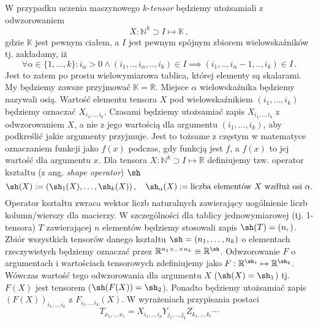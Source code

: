 \documentclass{myclass}
\begin{document}
W przypadku uczenia maszynowego \(k\)-\textit{tensor} będziemy utożsamiali z odwzorowaniem
\begin{equation*}
    X:\mathbb{N}^k\supset I \mapsto \mathbb{K}\,,
\end{equation*}
gdzie \(\mathbb{K}\) jest pewnym ciałem, a \(I\) jest pewnym spójnym zbiorem wielowskaźników tj.
zakładamy, iż 
\begin{equation*}
    \forall \alpha \in
    \{1,\ldots, k\} : i_\alpha > 0 \land (i_1,..,i_\alpha,..,i_k) \in I \implies (i_1,..,i_\alpha -
    1,..,i_k) \in I\,.
\end{equation*}
Jest to zatem po prostu wielowymiarowa tablica, której elementy są skalarami. My będziemy zawsze
przyjmować \(\mathbb{K} = \mathbb{R}\). Miejsce \(\alpha\) wielowskaźnika będziemy nazywali osią.
Wartość elementu tensora \(X\) pod wielowskaźnikiem \((i_1, \ldots, i_k)\) będziemy oznaczać
\(X_{i_1,..,i_k}\). Czasami będziemy utożsamiać zapis \(X_{i_1,..,i_k}\) z odwzorowaniem \(X\), a
nie z jego wartością dla argumentu \((i_1, \ldots, i_k)\), aby podkreślić jakie argumenty przyjmuje.
Jest to tożsame z częstym w matematyce oznaczaniem funkcji jako \(f(x)\) podczas, gdy funkcją jest
\(f\), a \(f(x)\) to jej wartość dla argumentu \(x\).\hfill \break
Dla tensora \(X:\mathbb{N}^k\supset I \mapsto \mathbb{R}\) definiujemy tzw. operator kształtu (z
ang. \textit{shape operator}) \(\sh\)
\begin{equation*}
    \sh(X) := (\sh_1(X), \ldots, \sh_k(X))\,,\quad \sh_\alpha(X) := \text{liczba elementów \(X\) wzdłuż osi \(\alpha\).}
\end{equation*}
Operator kształtu zwraca wektor liczb naturalnych zawierający uogólnienie liczb kolumn/wierszy dla
macierzy. W szczególności dla tablicy jednowymiarowej (tj. 1-tensora) \(T\) zawierającej \(n\)
elementów będziemy stosowali zapis \(\sh(T) = (n,)\).\hfill \break
Zbiór wszystkich tensorów danego kształtu \(\sh=(n_1,\ldots,n_k)\) o elementach rzeczywistych
będziemy oznaczać przez \(\mathbb{R}^{n_1\times..\times n_k} \equiv \mathbb{R}^\sh\). Odwzorowanie
\(F\) o argumentach i wartościach tensorowych zdefiniujemy jako \(F: \mathbb{R}^{\sh_1} \mapsto
\mathbb{R}^{\sh_2}\). Wówczas wartość tego odwzorowania dla argumentu \(X\) (\(\sh(X) = \sh_1\)) tj.
\(F(X)\) jest tensorem (\(\sh(F(X)) = \sh_2\)). Ponadto będziemy utożsamiać zapis
\((F(X))_{i_1,..,i_k}\) z \(F_{i_1,..,i_k}(X)\).\hfill
\break
W wyrażeniach przypisania postaci 
\begin{equation*}
    T_{x_1,..,x_s} = X_{i_1,..,i_p}Y_{j_1,..,j_q}Z_{k_1,..,k_r}\cdots
\end{equation*}
\end{document}
